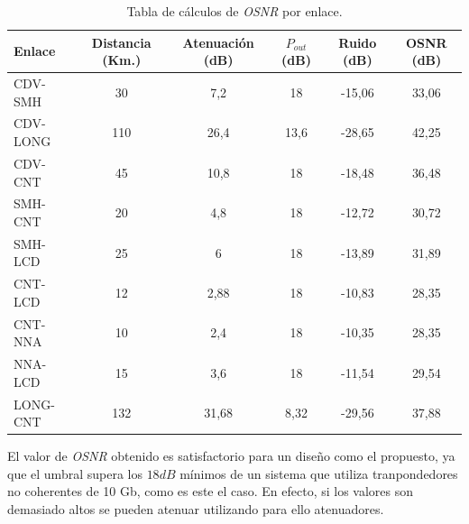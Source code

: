 \begin{table}[H]
  \centering
  \begin{tabular}{| l | c | c | c | c | c |}
    \hline{}
    Enlace & Distancia (Km.) & Atenuación (dB) & $P_{out}$ (dB) & Ruido (dB) & OSNR (dB) \\

    \hline
    CDV-SMH  & 30  & 7,2   & 18   & -15,06 & 33,06 \\
    CDV-LONG & 110 & 26,4  & 13,6 & -28,65 & 42,25 \\
    CDV-CNT  & 45  & 10,8  & 18   & -18,48 & 36,48 \\
    SMH-CNT  & 20  & 4,8   & 18   & -12,72 & 30,72 \\
    SMH-LCD  & 25  & 6     & 18   & -13,89 & 31,89 \\
    CNT-LCD  & 12  & 2,88  & 18   & -10,83 & 28,35 \\
    CNT-NNA  & 10  & 2,4   & 18   & -10,35 & 28,35 \\
    NNA-LCD  & 15  & 3,6   & 18   & -11,54 & 29,54 \\
    LONG-CNT & 132 & 31,68 & 8,32 & -29,56 & 37,88 \\
    \hline
  \end{tabular}
  \caption{Tabla de cálculos de \emph{OSNR} por enlace.}
  \label{tab:osnr1}
\end{table}

El valor de \emph{OSNR} obtenido es satisfactorio para un diseño como
el propuesto, ya que el umbral supera los $18dB$ mínimos de un sistema
que utiliza tranpondedores no coherentes de 10 Gb, como es este el
caso. En efecto, si los valores son demasiado altos se pueden atenuar
utilizando para ello atenuadores.
